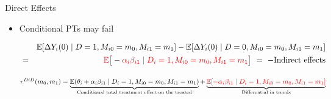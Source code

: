 \documentclass[aspectratio=1610, 9pt]{beamer}
\begin{document}
\begin{frame}{Direct Effects}


\begin{itemize}
    \item Conditional PTs may fail

    \vspace{-0.6cm}

    
\begin{eqnarray*}
    && \mathbb{E} [\Delta Y_{i}(0) \mid D=1,M_{i0}=m_0,M_{i1}=m_1]
    -\mathbb E[\Delta Y_{i}(0) \mid D=0,M_{i0}=m_0,M_{i1}=m_1]\\
   & = &\textcolor{red}{ \mathbb E\big[ -\alpha_i\beta_{i1} \mid D_i=1,M_{i0}=m_0,M_{i1}=m_1\big]} \ = \ - \text{Indirect effects}
\end{eqnarray*}

\hspace{-0.6cm} $\tau^{DiD}(m_0,m_1)= \underbrace{\mathbb{E}(\theta_i+\alpha_i\beta_{i1}\mid D_i=1,M_{i0}=m_0,M_{i1}=m_1)}_\text{Conditional total treatment effect on the treated}
     + \underbrace{\textcolor{red}{\mathbb{E}[-\alpha_i\beta_{i1}\mid D_i=1,M_{i0}=m_0,M_{i1}=m_1]}}_\text{Differential in trends}$
\end{itemize}

\vspace{0.2cm}



\centering
\begin{tikzpicture}[x=0.55pt,y=0.55pt,yscale=-1,xscale=1.1]


\end{tikzpicture}
\end{frame}
\end{document}
